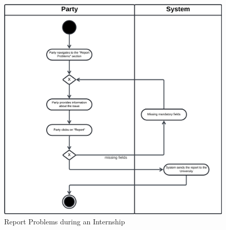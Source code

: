 \begin{figure}[H]
    \begin{center}
         \includegraphics[width=1\linewidth]{LaTeXCode/images/activity diagram/UC16.png}
         \caption{Report Problems during an Internship}
         \label{fig:report_problems_ad}
     \end{center}
\end{figure}

\newpage

